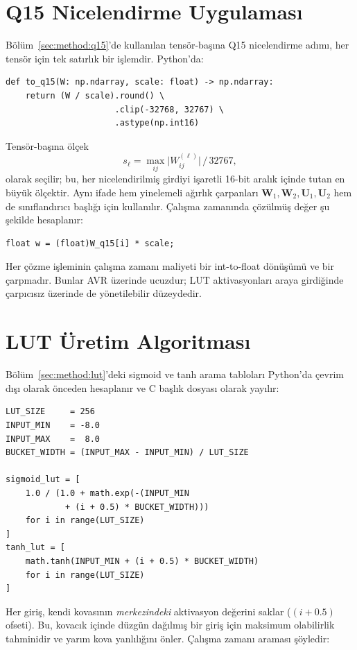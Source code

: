 \section{Q15 Nicelendirme Uygulaması}
\label{app:q15}

Bölüm~\ref{sec:method:q15}'de kullanılan tensör-başına Q15
nicelendirme adımı, her tensör için tek satırlık bir işlemdir.
Python'da:

\begin{verbatim}
def to_q15(W: np.ndarray, scale: float) -> np.ndarray:
    return (W / scale).round() \
                      .clip(-32768, 32767) \
                      .astype(np.int16)
\end{verbatim}

Tensör-başına ölçek
\[
s_\ell = \max_{ij}\bigl|W^{(\ell)}_{ij}\bigr| \,\big/\, 32767,
\]
olarak seçilir; bu, her nicelendirilmiş girdiyi işaretli 16-bit
aralık içinde tutan en büyük ölçektir. Aynı ifade hem yinelemeli
ağırlık çarpanları $\mathbf{W}_1, \mathbf{W}_2,
\mathbf{U}_1, \mathbf{U}_2$ hem de sınıflandırıcı başlığı için
kullanılır. Çalışma zamanında çözülmüş değer şu şekilde hesaplanır:

\begin{verbatim}
float w = (float)W_q15[i] * scale;
\end{verbatim}

Her çözme işleminin çalışma zamanı maliyeti bir int-to-float
dönüşümü ve bir çarpmadır. Bunlar AVR üzerinde ucuzdur; LUT
aktivasyonları araya girdiğinde çarpıcısız \msp{} üzerinde de
yönetilebilir düzeydedir.

\section{LUT Üretim Algoritması}
\label{app:lut}

Bölüm~\ref{sec:method:lut}'deki sigmoid ve tanh arama tabloları
Python'da çevrim dışı olarak önceden hesaplanır ve C başlık dosyası
olarak yayılır:

\begin{verbatim}
LUT_SIZE     = 256
INPUT_MIN    = -8.0
INPUT_MAX    =  8.0
BUCKET_WIDTH = (INPUT_MAX - INPUT_MIN) / LUT_SIZE

sigmoid_lut = [
    1.0 / (1.0 + math.exp(-(INPUT_MIN
            + (i + 0.5) * BUCKET_WIDTH)))
    for i in range(LUT_SIZE)
]
tanh_lut = [
    math.tanh(INPUT_MIN + (i + 0.5) * BUCKET_WIDTH)
    for i in range(LUT_SIZE)
]
\end{verbatim}

Her giriş, kendi kovasının \emph{merkezindeki} aktivasyon değerini
saklar ($(i + 0.5)$ ofseti). Bu, kovacık içinde düzgün dağılmış bir
giriş için maksimum olabilirlik tahminidir ve yarım kova yanlılığını
önler. Çalışma zamanı araması şöyledir:


